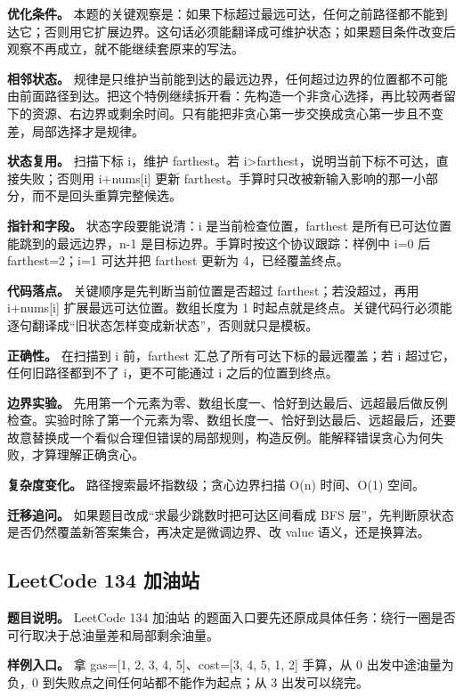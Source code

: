 \textbf{优化条件。} 本题的关键观察是：如果下标超过最远可达，任何之前路径都不能到达它；否则用它扩展边界。这句话必须能翻译成可维护状态；如果题目条件改变后观察不再成立，就不能继续套原来的写法。

\textbf{相邻状态。} 规律是只维护当前能到达的最远边界，任何超过边界的位置都不可能由前面路径到达。把这个特例继续拆开看：先构造一个非贪心选择，再比较两者留下的资源、右边界或剩余时间。只有能把非贪心第一步交换成贪心第一步且不变差，局部选择才是规律。

\textbf{状态复用。} 扫描下标 i，维护 farthest。若 i>farthest，说明当前下标不可达，直接失败；否则用 i+nums[i] 更新 farthest。手算时只改被新输入影响的那一小部分，而不是回头重算完整候选。

\textbf{指针和字段。} 状态字段要能说清：i 是当前检查位置，farthest 是所有已可达位置能跳到的最远边界，n-1 是目标边界。手算时按这个协议跟踪：样例中 i=0 后 farthest=2；i=1 可达并把 farthest 更新为 4，已经覆盖终点。

\textbf{代码落点。} 关键顺序是先判断当前位置是否超过 farthest；若没超过，再用 i+nums[i] 扩展最远可达位置。数组长度为 1 时起点就是终点。关键代码行必须能逐句翻译成“旧状态怎样变成新状态”，否则就只是模板。

\textbf{正确性。} 在扫描到 i 前，farthest 汇总了所有可达下标的最远覆盖；若 i 超过它，任何旧路径都到不了 i，更不可能通过 i 之后的位置到终点。

\textbf{边界实验。} 先用第一个元素为零、数组长度一、恰好到达最后、远超最后做反例检查。实验时除了第一个元素为零、数组长度一、恰好到达最后、远超最后，还要故意替换成一个看似合理但错误的局部规则，构造反例。能解释错误贪心为何失败，才算理解正确贪心。

\textbf{复杂度变化。} 路径搜索最坏指数级；贪心边界扫描 O(n) 时间、O(1) 空间。

\textbf{迁移追问。} 如果题目改成“求最少跳数时把可达区间看成 BFS 层”，先判断原状态是否仍然覆盖新答案集合，再决定是微调边界、改 value 语义，还是换算法。

\subsection{LeetCode 134 加油站}

\textbf{题目说明。} LeetCode 134 加油站 的题面入口要先还原成具体任务：绕行一圈是否可行取决于总油量差和局部剩余油量。

\textbf{样例入口。} 拿 gas=[1, 2, 3, 4, 5]、cost=[3, 4, 5, 1, 2] 手算，从 0 出发中途油量为负，0 到失败点之间任何站都不能作为起点；从 3 出发可以绕完。

